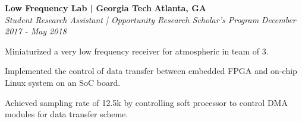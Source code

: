\headerrow
    {\textbf{Low Frequency Lab | Georgia Tech}}
    {\textbf{Atlanta, GA}}
\\
\headerrow
    {\emph{Student Research Assistant | Opportunity Research Scholar's Program}}
    {\emph{December 2017 - May 2018}}
    
\begin{itemize*}
    \item Miniaturized a very low frequency receiver for atmospheric in team of 3. 
    \item Implemented the control of data transfer between embedded FPGA and on-chip Linux system on an SoC board.
    \item Achieved sampling rate of 12.5k by controlling soft processor to control DMA modules for data transfer scheme.
\end{itemize*}	